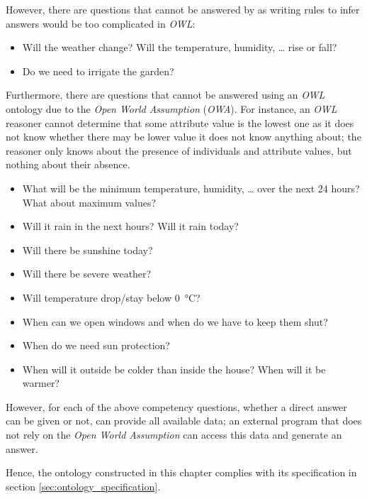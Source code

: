 However, there are questions that cannot be answered by \thinkhomeweather as writing rules to infer answers would be too complicated in \emph{OWL}:
\begin{itemize}
  \item Will the weather change? Will the temperature, humidity, … rise or fall?
  \item Do we need to irrigate the garden?
\end{itemize}

Furthermore, there are questions that cannot be answered using an \emph{OWL} ontology due to the \emph{Open World Assumption} (\emph{OWA})\cite{open-world-assumption}. For instance, an \emph{OWL} reasoner cannot determine that some attribute value is the lowest one as it does not know whether there may be lower value it does not know anything about; the reasoner only knows about the presence of individuals and attribute values, but nothing about their absence.

\begin{itemize}
  \item What will be the minimum temperature, humidity, … over the next 24 hours? What about maximum values?
  \item Will it rain in the next hours? Will it rain today?
  \item Will there be sunshine today?
  \item Will there be severe weather?
  \item Will temperature drop/stay below \SI{0}{\celsius}?
  \item When can we open windows and when do we have to keep them shut?
  \item When do we need sun protection?
  \item When will it outside be colder than inside the house? When will it be warmer?
\end{itemize}

However, for each of the above competency questions, whether a direct answer can be given or not, \thinkhomeweather can provide all available data; an external program that does not rely on the \emph{Open World Assumption} can access this data and generate an answer.

Hence, the ontology constructed in this chapter complies with its specification in section \ref{sec:ontology_specification}.

